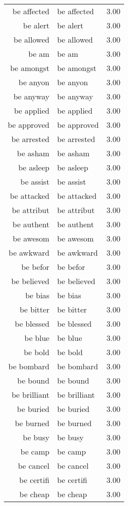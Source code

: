 \begin{table}[ht]
\begin{tabular}{rlr}
  be affected & be affected & 3.00 \\ 
  be alert & be alert & 3.00 \\ 
  be allowed & be allowed & 3.00 \\ 
  be am & be am & 3.00 \\ 
  be amongst & be amongst & 3.00 \\ 
  be anyon & be anyon & 3.00 \\ 
  be anyway & be anyway & 3.00 \\ 
  be applied & be applied & 3.00 \\ 
  be approved & be approved & 3.00 \\ 
  be arrested & be arrested & 3.00 \\ 
  be asham & be asham & 3.00 \\ 
  be asleep & be asleep & 3.00 \\ 
  be assist & be assist & 3.00 \\ 
  be attacked & be attacked & 3.00 \\ 
  be attribut & be attribut & 3.00 \\ 
  be authent & be authent & 3.00 \\ 
  be awesom & be awesom & 3.00 \\ 
  be awkward & be awkward & 3.00 \\ 
  be befor & be befor & 3.00 \\ 
  be believed & be believed & 3.00 \\ 
  be bias & be bias & 3.00 \\ 
  be bitter & be bitter & 3.00 \\ 
  be blessed & be blessed & 3.00 \\ 
  be blue & be blue & 3.00 \\ 
  be bold & be bold & 3.00 \\ 
  be bombard & be bombard & 3.00 \\ 
  be bound & be bound & 3.00 \\ 
  be brilliant & be brilliant & 3.00 \\ 
  be buried & be buried & 3.00 \\ 
  be burned & be burned & 3.00 \\ 
  be busy & be busy & 3.00 \\ 
  be camp & be camp & 3.00 \\ 
  be cancel & be cancel & 3.00 \\ 
  be certifi & be certifi & 3.00 \\ 
  be cheap & be cheap & 3.00 \\ 

\end{tabular}
\end{table}

